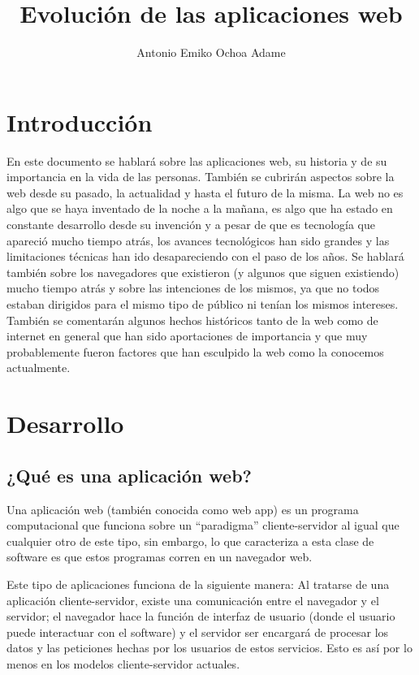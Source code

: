 \documentclass{article}
\begin{document}
\title{Evolución de las aplicaciones web}
\author{Antonio Emiko Ochoa Adame}
\maketitle

\tableofcontents

\section{Introducción}
En este documento se hablará sobre las aplicaciones web, su historia y de su
importancia en la vida de las personas. También se cubrirán aspectos sobre
la web desde su pasado, la actualidad y hasta el futuro de la misma.
La web no es algo que se haya inventado de la noche a la mañana, es algo que
ha estado en constante desarrollo desde su invención y a pesar de que es tecnología que
apareció mucho tiempo atrás, los avances tecnológicos han sido grandes y las
limitaciones técnicas han ido desapareciendo con el paso de los años.
Se hablará también sobre los navegadores que existieron (y algunos que siguen
existiendo) mucho tiempo atrás y sobre las intenciones de los mismos, ya que no
todos estaban dirigidos para el mismo tipo de público ni tenían los mismos
intereses.
También se comentarán algunos hechos históricos tanto de la web como de internet
en general que han sido aportaciones de importancia y que muy probablemente
fueron factores que han esculpido la web como la conocemos actualmente.

\section{Desarrollo}

\subsection{¿Qué es una aplicación web?}
Una aplicación web (también conocida como web app) es un programa computacional
que funciona sobre un ``paradigma'' cliente-servidor al igual que cualquier otro
de este tipo, sin embargo, lo que caracteriza a esta clase de software es que
estos programas corren en un navegador web\cite{wiki_web_app}.

Este tipo de aplicaciones funciona de la siguiente manera: Al tratarse de una
aplicación cliente-servidor, existe una comunicación entre el navegador y el
servidor; el navegador hace la función de interfaz de usuario (donde el usuario
puede interactuar con el software) y el servidor ser encargará de procesar los
datos y las peticiones hechas por los usuarios de estos servicios. Esto es así
por lo menos en los modelos cliente-servidor actuales.
\end{document}

